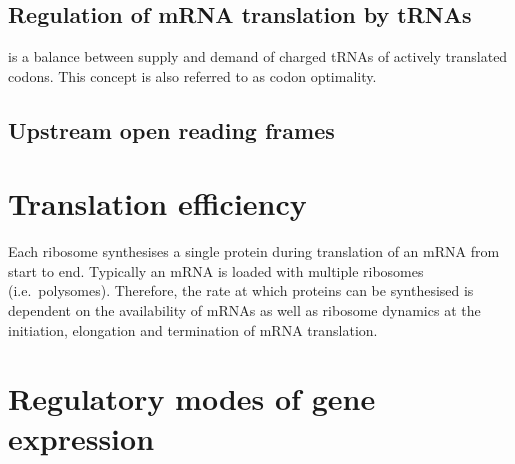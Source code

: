 \documentclass[12pt,openany]{book}
\begin{document}
\subsection{Regulation of mRNA translation by tRNAs}

is a balance between supply and demand of charged tRNAs of actively
translated codons. This concept is also referred to as codon optimality.

\subsection{Upstream open reading frames}

\section{Translation efficiency}

Each ribosome synthesises a single protein during translation of an mRNA
from start to end. Typically an mRNA is loaded with multiple ribosomes
(i.e.~polysomes). Therefore, the rate at which proteins can be
synthesised is dependent on the availability of mRNAs as well as
ribosome dynamics at the initiation, elongation and termination of mRNA
translation.

\section{Regulatory modes of gene expression}
\end{document}
